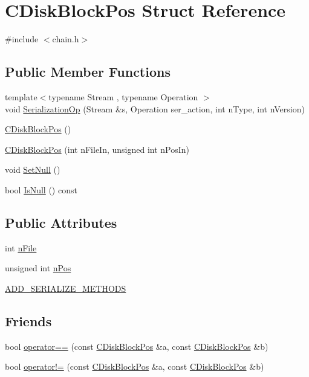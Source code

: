 \hypertarget{struct_c_disk_block_pos}{}\section{C\+Disk\+Block\+Pos Struct Reference}
\label{struct_c_disk_block_pos}


{\ttfamily \#include $<$chain.\+h$>$}

\subsection*{Public Member Functions}
\begin{DoxyCompactItemize}
\item 
{\footnotesize template$<$typename Stream , typename Operation $>$ }\\void \hyperlink{struct_c_disk_block_pos_a821bb4eebc99ae39c20133d80244325f}{Serialization\+Op} (Stream \&s, Operation ser\+\_\+action, int n\+Type, int n\+Version)
\item 
\hyperlink{struct_c_disk_block_pos_ac34e46c8bf3256b3eca09f54911cf8bd}{C\+Disk\+Block\+Pos} ()
\item 
\hyperlink{struct_c_disk_block_pos_a0c96947d09bb4aaf28ab2d7866d20918}{C\+Disk\+Block\+Pos} (int n\+File\+In, unsigned int n\+Pos\+In)
\item 
void \hyperlink{struct_c_disk_block_pos_a0a6ba113219a456472081ee6d6b20a72}{Set\+Null} ()
\item 
bool \hyperlink{struct_c_disk_block_pos_a924f2805b274345afce890b27a0934d9}{Is\+Null} () const 
\end{DoxyCompactItemize}
\subsection*{Public Attributes}
\begin{DoxyCompactItemize}
\item 
int \hyperlink{struct_c_disk_block_pos_a09f30dab5c02fbdea8a17f9bcee5aac8}{n\+File}
\item 
unsigned int \hyperlink{struct_c_disk_block_pos_a9b4b5e149b655ac5c22d05883b5bca0e}{n\+Pos}
\item 
\hyperlink{struct_c_disk_block_pos_a958cd730b290bbb0153d514c56517590}{A\+D\+D\+\_\+\+S\+E\+R\+I\+A\+L\+I\+Z\+E\+\_\+\+M\+E\+T\+H\+O\+D\+S}
\end{DoxyCompactItemize}
\subsection*{Friends}
\begin{DoxyCompactItemize}
\item 
bool \hyperlink{struct_c_disk_block_pos_a04787eb60da48b80e0f7fb402c6896fe}{operator==} (const \hyperlink{struct_c_disk_block_pos}{C\+Disk\+Block\+Pos} \&a, const \hyperlink{struct_c_disk_block_pos}{C\+Disk\+Block\+Pos} \&b)
\item 
bool \hyperlink{struct_c_disk_block_pos_af77481af6cf1d32788ba67c29cc061b5}{operator!=} (const \hyperlink{struct_c_disk_block_pos}{C\+Disk\+Block\+Pos} \&a, const \hyperlink{struct_c_disk_block_pos}{C\+Disk\+Block\+Pos} \&b)
\end{DoxyCompactItemize}


